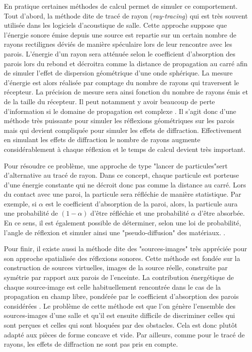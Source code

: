 En pratique certaines méthodes de calcul permet de simuler ce comportement. Tout d'abord, la méthode dite de tracé de rayon (\textit{ray-tracing}) qui est très souvent utilisée dans les logiciels d'acoustique de salle. Cette approche suppose que l’énergie sonore émise depuis une source est repartie sur un certain nombre de rayons rectilignes déviés de manière spéculaire lors de leur rencontre avec les parois. L'énergie d'un rayon sera atténuée selon le coefficient d'absorption des parois lors du rebond et décroitra comme la distance de propagation au carré afin de simuler l'effet de dispersion géométrique d'une onde sphérique. La mesure d'énergie est alors réalisée par comptage du nombre de rayons qui traversent le récepteur. La précision de mesure sera ainsi fonction du nombre de rayons émis et de la taille du récepteur. Il peut notamment y avoir beaucoup de perte d'information si le domaine de propagation est complexe \cite[p. 60]{picaut}. Il s'agit donc d'une méthode très puissante pour simuler les réflexions géométriques sur les parois mais qui devient compliquée pour simuler les effets de diffraction. Effectivement en simulant les effets de diffraction le nombre de rayons augmente considérablement à chaque réflexion et le temps de calcul devient très important. 

Pour résoudre ce problème, une approche de type "lancer de particules"sert d'alternative au tracé de rayon. Dans ce concept, chaque particule est porteuse d’une énergie constante qui ne décroit donc pas comme la distance au carré. Lors du contact avec une paroi, la particule sera réfléchie de manière statistique. Par exemple, si $\alpha$ est le coefficient d'absorption de la paroi, alors, la particule aura une probabilité de $(1-\alpha)$ d'être réfléchie et une probabilité $\alpha$ d'être absorbée. En ce sens, il est également possible de déterminer, selon une loi de probabilité, l'angle de réflexion et simuler ainsi une "pseudo-diffusion" des matériaux. \cite[p. 62]{picaut}.


Pour finir, il existe aussi la méthode dite des "sources-images" très appréciée pour son approche spatialisée des réflexions sonores. Cette méthode est fondée sur la construction de sources virtuelles, images de la source réelle, construite par symétrie par rapport aux parois de l'enceinte. La contribution énergétique de chaque source-image est celle habituellement rencontrée dans le cas de la propagation en champ libre, pondérée par le coefficient d’absorption des parois considérées \cite[p. 60]{picaut}.
Le problème de cette méthode est que l'on génère l'ensemble des sources-images d'une salle et qu'il est ensuite difficile de discriminer celles qui sont perçues et celles qui sont bloquées par des obstacles. Cela est donc plutôt adapté aux pièces de forme concave et vide. Par ailleurs, comme pour le tracé de rayons, les effets de diffraction ne sont pas pris en compte. 


